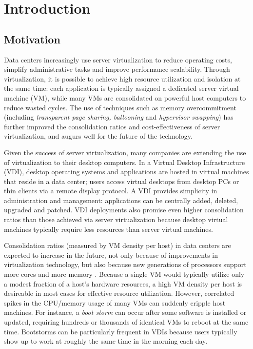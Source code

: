 \chapter{Introduction}
\section{Motivation}
Data centers increasingly use server virtualization to
reduce operating costs, simplify administrative tasks and improve 
performance scalability. Through virtualization, it is
possible to achieve high resource utilization and isolation at the same time:
each application is typically assigned a dedicated server virtual machine (VM), 
while many VMs are consolidated on powerful host computers
to reduce wasted cycles. The use of techniques such as memory overcommitment (including 
\emph{transparent page sharing, ballooning} and \emph{hypervisor swapping}) \cite{waldspurger2002memory} 
has further improved the consolidation ratios and cost-effectiveness 
of server virtualization, and augurs well for the future of the technology.

Given the success of server virtualization, many companies are 
extending the use of virtualization to their desktop computers.
In a Virtual Desktop Infrastructure \cite{vmwarevdi} (VDI), 
desktop operating systems and applications are hosted in 
virtual machines that reside in a data center; 
users access virtual desktops from desktop PCs or thin clients
via a remote display protocol. A VDI provides simplicity 
in administration and management: applications
can be centrally added, deleted, upgraded and patched. 
VDI deployments also promise even
higher consolidation ratios than those achieved via server virtualization
because desktop virtual machines typically require
less resources than server virtual machines.

Consolidation ratios (measured by VM density per host) in data centers
are expected to increase in the future, not only because of
improvements in virtualization technology, but also because
new generations of processors support more cores and 
more memory \cite{hansen2010lithium}. 
Because a single VM would typically utilize only a modest fraction of a 
host's hardware resources, a high VM density per host is
desireable in most cases for effective resource utilization. 
However, correlated spikes in the CPU/memory usage of many VMs can suddenly 
cripple host machines. For instance, a \emph{boot storm} \cite{hansen2010lithium, 
liao2011vmstore, meng2010tide, rajan2010vdc, vaghani2010virtual}
can occur after some software is installed or updated, requiring hundreds 
or thousands of identical VMs to reboot at the same time.
Bootstorms can be particularly frequent in VDIs because 
users typically show up to work at roughly the same time
in the morning each day. 

